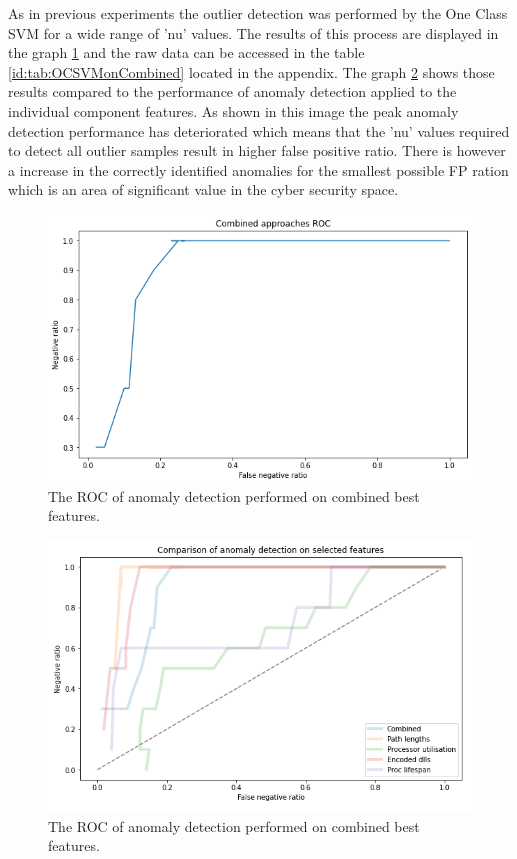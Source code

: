 \documentclass[a4paper,twoside,12pt]{book}
\begin{document}
As in previous experiments the outlier detection was performed by the One Class SVM for a wide range of 'nu' values. The results of 
this process are displayed in the graph \ref{fig:combinedFinalROC} and the raw data can be accessed in the table 
\ref{id:tab:OCSVMonCombined} located in the appendix. The graph \ref{fig:combinedCompFinalROC} shows those results compared to 
the performance of anomaly detection applied to the individual component features. As shown in this image the peak anomaly
detection performance has deteriorated which means that the 'nu' values required to detect all outlier samples result in higher
false positive ratio. There is however a increase in the correctly identified anomalies for the smallest possible FP ration which 
is an area of significant value in the cyber security space.

\begin{figure}
	\centering
	\includegraphics[scale=0.9]{images/CombinedFinalROC}
	\caption{The ROC of anomaly detection performed on combined best features.}
	\label{fig:combinedFinalROC}
 \end{figure}


 \begin{figure}
	\centering
	\includegraphics[scale=0.9]{images/CombinedCompFinalROC}
	\caption{The ROC of anomaly detection performed on combined best features.}
	\label{fig:combinedCompFinalROC}
 \end{figure}
\end{document}
